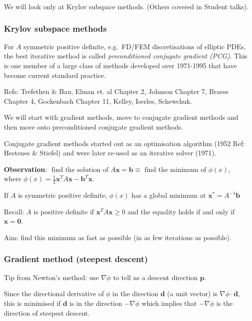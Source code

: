 \documentclass[12pt, a4paper]{article}
\renewcommand{\vec}[1]{\mathbf{#1}}
\theoremstyle{definition}
\theoremstyle{remark}
\numberwithin{equation}{section}
\begin{document}
We will look only at Krylov subspace methods. (Others covered in Student talks).

\newpage
\subsubsection{Krylov subspace methods}

For $A$ symmetric positive definite, e.g.\ FD/FEM discretisations of elliptic PDEs,
the best iterative method is called \emph{preconditioned conjugate gradient (PCG)}. 
This is one member of a large class of methods developed over 1971-1995 that have become 
current standard practice. 



Refs: Trefethen \& Bau, Elman et. al Chapter 2, Johnson Chapter 7, Braess Chapter 4, 
Gockenbach Chapter 11, Kelley, Iserles, Schewchuk. 



We will start with gradient methods, move to conjugate gradient methods and then move onto preconditioned conjugate gradient methods.

Conjugate gradient methods started out as an optimisation algorithm (1952 Ref: Hestenes \& Stiefel) and were later re-used as an iterative solver (1971).


{\bf {} Observation}: 
$\mbox{ find the solution of $A\vec{x}=\vec{b}$} \equiv \mbox{ find the minimum of $\phi(x)$}$, where $\phi(x)=\frac{1}{2}\vec{x}^TA\vec{x}-\vec{b}^T\vec{x}$.

If $A$ is symmetric positive definite, $\phi(x)$ has a global minimum at $\vec{x}^*=A^{-1}\vec{b}$ 

Recall: $A$ is positive definite if $\vec{x}^TA\vec{x} \ge 0$ and the equality holds if and only if $\vec{x}=\vec{0}$.

Aim: find this minimum as fast as possible (in as few iterations as possible).

\newpage
\subsubsection{Gradient method (steepest descent)}

Tip from Newton's method: use $\nabla \phi$ to tell us a descent direction $\vec{p}$.

Since the directional derivative of $\phi$ in the direction $\vec{d}$ (a unit vector)  is $\nabla \phi \cdot \vec{d}$,
 this is minimised if $\vec{d}$ is in the direction $-\nabla\phi$ which implies that $-\nabla \phi$ is the direction of steepest descent.
\end{document}
